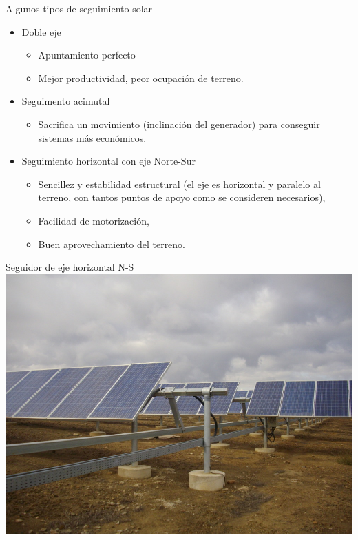 \documentclass[xcolor={usenames,svgnames,dvipsnames}]{beamer}
\begin{document}
\begin{frame}[label=sec-2-1-3]{Algunos tipos de seguimiento solar}
\begin{itemize}
\item \alert{Doble eje}

\begin{itemize}
\item Apuntamiento \guillemotleft{}perfecto\guillemotright{}

\item Mejor productividad, peor ocupación de terreno.
\end{itemize}

\item \alert{Seguimento acimutal}

\begin{itemize}
\item Sacrifica un movimiento (inclinación del generador) para conseguir
sistemas más económicos.
\end{itemize}

\item \alert{Seguimiento horizontal con eje Norte-Sur}

\begin{itemize}
\item Sencillez y estabilidad estructural (el eje es horizontal y
paralelo al terreno, con tantos puntos de apoyo como se consideren
necesarios),

\item Facilidad de motorización,

\item Buen aprovechamiento del terreno.
\end{itemize}
\end{itemize}
\end{frame}


\begin{frame}[label=sec-2-1-4]{Seguidor de eje horizontal N-S}
\includegraphics[width=.9\linewidth]{../figs/SeguidorEjeHorizontal.jpg}
\end{frame}
\end{document}
